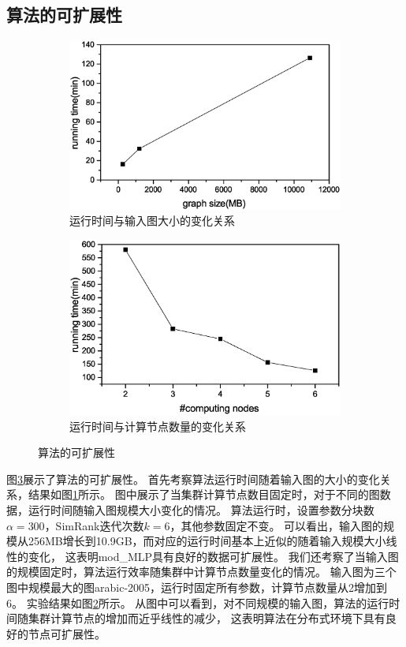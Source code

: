 \documentclass[master]{njuthesis}
\begin{document}
\subsection{算法的可扩展性}
\begin{figure}[h]
\centering
\begin{subfigure}[b]{0.48\textwidth}
	\center
	\includegraphics[width=1\textwidth]{figure/ch3_data_scalabity.eps}
	\caption{运行时间与输入图大小的变化关系}
	\label{fig:ch3:data_scalabity}
\end{subfigure}
\begin{subfigure}[b]{0.48\textwidth}
	\centering
	\includegraphics[width=1\textwidth]{figure/ch3_node_scalability.eps}
	\caption{运行时间与计算节点数量的变化关系}
	\label{fig:ch3:node_scalabity}
\end{subfigure}
\caption{算法的可扩展性}
\label{fig:ch3:scala}
\end{figure}
图\ref{fig:ch3:scala}展示了算法的可扩展性。
首先考察算法运行时间随着输入图的大小的变化关系，结果如图\ref{fig:ch3:data_scalabity}所示。
图中展示了当集群计算节点数目固定时，对于不同的图数据，运行时间随输入图规模大小变化的情况。 
算法运行时，设置参数分块数$\alpha=300$，SimRank迭代次数$k=6$，其他参数固定不变。
可以看出，输入图的规模从256MB增长到10.9GB，而对应的运行时间基本上近似的随着输入规模大小线性的变化，
这表明mod\string_MLP具有良好的数据可扩展性。
我们还考察了当输入图的规模固定时，算法运行效率随集群中计算节点数量变化的情况。
输入图为三个图中规模最大的图arabic-2005，运行时固定所有参数，计算节点数量从2增加到6。
实验结果如图\ref{fig:ch3:node_scalabity}所示。
从图中可以看到，对不同规模的输入图，算法的运行时间随集群计算节点的增加而近乎线性的减少，
这表明算法在分布式环境下具有良好的节点可扩展性。
\end{document}
